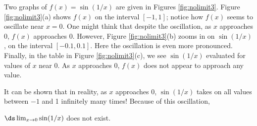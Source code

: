 \pagebreak

%
{%
Two graphs of $f(x) = \sin(1/x)$ are given in Figures \ref{fig:nolimit3}. Figure \ref{fig:nolimit3}(a) shows $f(x)$ on the interval $[-1,1]$; notice how $f(x)$ seems to oscillate near $x=0$. One might think that despite the oscillation, as $x$ approaches 0, $f(x)$ approaches 0. However, Figure \ref{fig:nolimit3}(b) zooms in on $\sin(1/x)$, on the interval $[-0.1,0.1]$. Here the oscillation is even more pronounced. Finally, in the table in Figure \ref{fig:nolimit3}(c), we see $\sin(1/x)$ evaluated for values of $x$ near 0. As $x$ approaches 0, $f(x)$ does not appear to approach any value. 

It can be shown that in reality, as $x$ approaches 0, $\sin(1/x)$ takes on all values between $-1$ and 1 infinitely many times! Because of this oscillation,

 $\ds\lim_{x\to 0}\sin(1/x)$ does not exist.}\\

